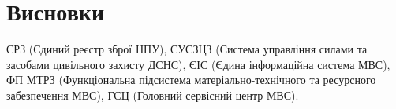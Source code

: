 \chapter{Висновки}

ЄРЗ (Єдиний реєстр зброї НПУ),
СУСЗЦЗ (Система управління силами та засобами цивільного захисту ДСНС),
ЄІС (Єдина інформаційна система МВС),
ФП МТРЗ (Функціональна підсистема матеріально-технічного та ресурсного забезпечення МВС),
ГСЦ (Головний сервісний центр МВС).


